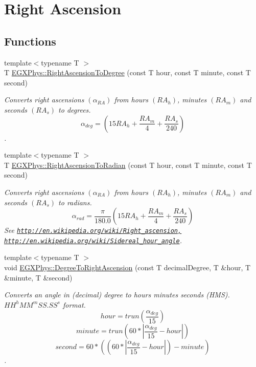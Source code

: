 \hypertarget{group___e_g_x_phys-_astrophysics-_right_ascension}{}\section{Right Ascension}
\label{group___e_g_x_phys-_astrophysics-_right_ascension}
\subsection*{Functions}
\begin{DoxyCompactItemize}
\item 
{\footnotesize template$<$typename T $>$ }\\T \mbox{\hyperlink{group___e_g_x_phys-_astrophysics-_right_ascension_ga27ba790eb8358535613d3b32f97d9e3a}{E\+G\+X\+Phys\+::\+Right\+Ascension\+To\+Degree}} (const T hour, const T minute, const T second)
\begin{DoxyCompactList}\small\item\em Converts right ascensions $(\alpha_{RA})$ from hours $(RA_h)$, minutes $(RA_m)$ and seconds $(RA_s)$ to degrees. \[\alpha_{deg}=(15 RA_h + \frac{RA_m}{4} + \frac{RA_s}{240})\]. \end{DoxyCompactList}\item 
{\footnotesize template$<$typename T $>$ }\\T \mbox{\hyperlink{group___e_g_x_phys-_astrophysics-_right_ascension_ga63a3103990c95078443e39a5b487ab0d}{E\+G\+X\+Phys\+::\+Right\+Ascension\+To\+Radian}} (const T hour, const T minute, const T second)
\begin{DoxyCompactList}\small\item\em Converts right ascensions $(\alpha_{RA})$ from hours $(RA_h)$, minutes $(RA_m)$ and seconds $(RA_s)$ to radians. \[\alpha_{rad}=\frac{\pi}{180.0}(15 RA_h + \frac{RA_m}{4} + \frac{RA_s}{240})\] See \href{http://en.wikipedia.org/wiki/Right_ascension,}{\tt http\+://en.\+wikipedia.\+org/wiki/\+Right\+\_\+ascension,} \href{http://en.wikipedia.org/wiki/Sidereal_hour_angle}{\tt http\+://en.\+wikipedia.\+org/wiki/\+Sidereal\+\_\+hour\+\_\+angle}. \end{DoxyCompactList}\item 
{\footnotesize template$<$typename T $>$ }\\void \mbox{\hyperlink{group___e_g_x_phys-_astrophysics-_right_ascension_ga6fdbd35a030d278f396496899a1c236f}{E\+G\+X\+Phys\+::\+Degree\+To\+Right\+Ascension}} (const T decimal\+Degree, T \&hour, T \&minute, T \&second)
\begin{DoxyCompactList}\small\item\em Converts an angle in (decimal) degree to hours minutes seconds (H\+MS). ${HH}^{h}{MM}^{m}{SS.SS}^{s}$ format. \[hour=trun(\frac{\alpha_{deg}}{15})\] \[minute=trun(60 * |\frac{\alpha_{deg}}{15} - hour|)\] \[second=60 * ((60 * |\frac{\alpha_{deg}}{15} - hour|)-minute)\]. \end{DoxyCompactList}\item 

\end{DoxyCompactItemize}
